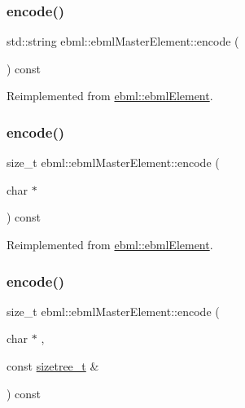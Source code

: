 \subsubsection{\texorpdfstring{encode()}{encode()}\hspace{0.1cm}{\footnotesize\ttfamily [1/3]}}
{\footnotesize\ttfamily std\+::string ebml\+::ebml\+Master\+Element\+::encode (\begin{DoxyParamCaption}{ }\end{DoxyParamCaption}) const\hspace{0.3cm}{\ttfamily [virtual]}}



Reimplemented from \mbox{\hyperlink{classebml_1_1ebmlElement_aaeddd5ffc1da2f3d4f2a9c9ec1dbed4d}{ebml\+::ebml\+Element}}.

\mbox{\label{classebml_1_1ebmlMasterElement_ac0bc9d595746939fea3e30b810d89c9f}} 
\subsubsection{\texorpdfstring{encode()}{encode()}\hspace{0.1cm}{\footnotesize\ttfamily [2/3]}}
{\footnotesize\ttfamily size\+\_\+t ebml\+::ebml\+Master\+Element\+::encode (\begin{DoxyParamCaption}\item[{char $\ast$}]{ }\end{DoxyParamCaption}) const\hspace{0.3cm}{\ttfamily [virtual]}}



Reimplemented from \mbox{\hyperlink{classebml_1_1ebmlElement_a5aeddfac34c2c839873146be6c634aed}{ebml\+::ebml\+Element}}.

\mbox{\label{classebml_1_1ebmlMasterElement_af9c776725a15ddff8a66d6c42bb7610f}} 
\subsubsection{\texorpdfstring{encode()}{encode()}\hspace{0.1cm}{\footnotesize\ttfamily [3/3]}}
{\footnotesize\ttfamily size\+\_\+t ebml\+::ebml\+Master\+Element\+::encode (\begin{DoxyParamCaption}\item[{char $\ast$}]{,  }\item[{const \mbox{\hyperlink{structebml_1_1sizetree__t}{sizetree\+\_\+t}} \&}]{ }\end{DoxyParamCaption}) const}

